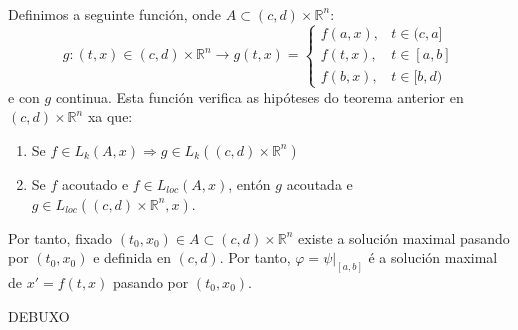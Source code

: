 \documentclass[11pt, a4paper,twoside]{article}
\makeatletter
\theoremstyle{theorem-style}  %
\renewenvironment{proof}[1][\proofname]{\par
	\pushQED{\qed}%
	\normalfont \topsep6\p@\@plus6\p@\relax
	\list{}{%
		\settowidth{\leftmargin}{\quad:\hskip\labelsep}%
		\setlength{\labelwidth}{0pt}%
		\setlength{\itemindent}{-\leftmargin}%
	}%
	\item[\hskip\labelsep\itshape#1\@addpunct{:}]\ignorespaces
}{%
	\popQED\endlist\@endpefalse
}
\theoremstyle{definition-style}
\theoremstyle{example-style}
\makeatother
\begin{document}
\begin{proof}\ \\
	Definimos a seguinte función, onde $A \subset (c, d) \times \mathbb{R}^n$:
	\[g: (t, x) \in (c, d) \times \mathbb{R}^n \longrightarrow g(t, x) = \begin{cases}
	f(a, x), &t \in (c, a] \\
	f(t, x), &t \in [a, b] \\
	f(b, x), &t \in [b, d)
	\end{cases}\]
	e con $g$ continua. Esta función verifica as hipóteses do teorema anterior en $(c, d) \times \mathbb{R}^n$ xa que:
	\begin{enumerate}[-]
		\item Se $f \in L_k(A, x) \Rightarrow g \in L_k ((c, d) \times \mathbb{R}^n)$
		\item Se $f$ acoutado e $f \in L_{loc} (A, x)$, entón $g$ acoutada e $g \in L_{loc} ((c, d) \times \mathbb{R}^n, x)$.
	\end{enumerate}
	Por tanto, fixado $(t_0, x_0) \in A \subset (c, d) \times \mathbb{R}^n$ existe a solución maximal pasando por $(t_0, x_0)$ e definida en $(c, d)$. Por tanto, $\varphi = \psi|_{[a, b]}$ é a solución maximal de $x' = f(t, x)$ pasando por $(t_0, x_0)$.
	
	DEBUXO
	\end{proof}
\end{document}
